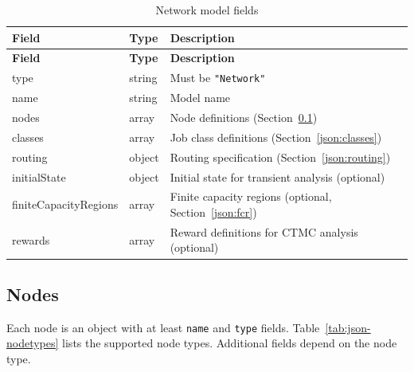 \begin{footnotesize}
\begin{longtable}{|T{2.2cm}|T{2.2cm}|D{8.5cm}|}
\caption{Network model fields}\label{tab:json-network}
\\\hline
\textbf{Field} & \textbf{Type} & \textbf{Description} \\\hline
\endfirsthead
\hline \textbf{Field} & \textbf{Type} & \textbf{Description} \\\hline
\endhead
\hline
\endfoot
type     & string & Must be \texttt{"Network"} \\\hline
name     & string & Model name \\\hline
nodes    & array  & Node definitions (Section~\ref{json:nodes}) \\\hline
classes  & array  & Job class definitions (Section~\ref{json:classes}) \\\hline
routing  & object & Routing specification (Section~\ref{json:routing}) \\\hline
initialState & object & Initial state for transient analysis (optional) \\\hline
finiteCapacityRegions & array & Finite capacity regions (optional, Section~\ref{json:fcr}) \\\hline
rewards  & array  & Reward definitions for CTMC analysis (optional) \\\hline
\end{longtable}
\end{footnotesize}

\subsection{Nodes}
\label{json:nodes}

Each node is an object with at least \texttt{name} and \texttt{type} fields. Table~\ref{tab:json-nodetypes} lists the supported node types. Additional fields depend on the node type.

